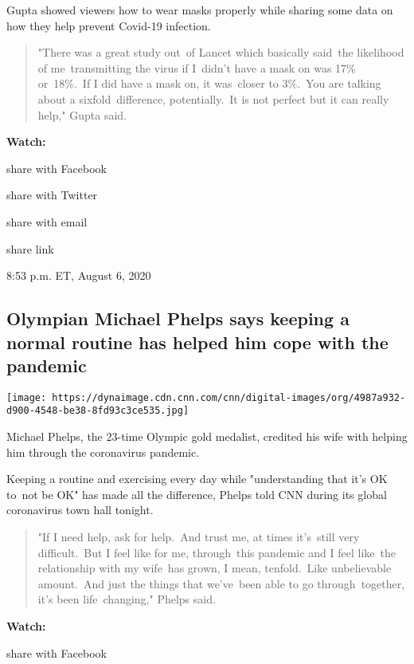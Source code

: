 Gupta showed viewers how to wear masks properly while sharing some data
on how they help prevent Covid-19 infection.

\begin{quote}
"There was a great study out~of Lancet which basically said~the
likelihood of me~transmitting the virus if I~didn't have a mask on was
17\% or~18\%.~If I did have a mask on, it was~closer to 3\%.~You are
talking about a sixfold~difference, potentially.~It is not perfect but
it can really help," Gupta said.
\end{quote}

\textbf{Watch:}

share with Facebook

share with Twitter

share with email

share link

8:53 p.m. ET, August 6, 2020

\hypertarget{olympian-michael-phelps-says-keeping-a-normal-routine-has-helped-him-cope-with-the-pandemic}{%
\subsection{Olympian Michael Phelps says keeping a normal routine has
helped him cope with the
pandemic}\label{olympian-michael-phelps-says-keeping-a-normal-routine-has-helped-him-cope-with-the-pandemic}}

\texttt{[image: https://dynaimage.cdn.cnn.com/cnn/digital-images/org/4987a932-d900-4548-be38-8fd93c3ce535.jpg]}

Michael Phelps, the 23-time Olympic gold medalist, credited his wife
with helping him through the coronavirus pandemic.

Keeping a routine and exercising every day while "understanding that
it's OK to~not be OK" has made all the difference, Phelps told CNN
during its global coronavirus town hall tonight.

\begin{quote}
"If I need help, ask for help.~And trust me, at times it's~still very
difficult.~But I feel like for me, through~this pandemic and I feel
like~the relationship with my wife~has grown, I mean, tenfold.~Like
unbelievable amount.~And just the things that we've~been able to go
through~together, it's been life~changing," Phelps said.
\end{quote}

\textbf{Watch:}

share with Facebook

